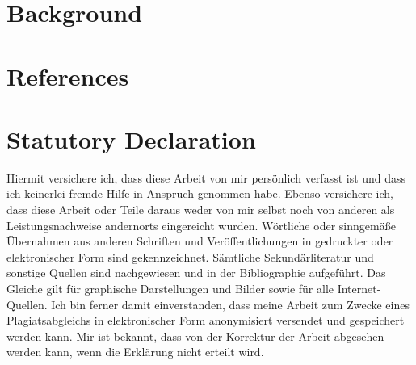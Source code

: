 \documentclass[12pt,english,a4paper,oneside]{article}
\newlength{\cslhangindent}
\newlength{\cslentryspacingunit} %
\newenvironment{CSLReferences}[2] %
 {%
  \setlength{\parindent}{0pt}
  \ifodd #1
  \let\oldpar\par
  \def\par{\hangindent=\cslhangindent\oldpar}
  \fi
  \setlength{\parskip}{#2\cslentryspacingunit}
 }%
 {}
\begin{document}
\newpage







{
\setcounter{tocdepth}{2}
\newpage
{}
\tableofcontents
}

\newpage
{}
\pagestyle{plain}
\hypertarget{background}{%
\section{Background}\label{background}}

\newpage

\hypertarget{references}{%
\section*{References}\label{references}}

\singlespacing

\hypertarget{refs}{}
\begin{CSLReferences}{0}{0}
\end{CSLReferences}

\clearpage

\hypertarget{statutory-declaration}{%
\section*{Statutory Declaration}\label{statutory-declaration}}

Hiermit versichere ich, dass diese Arbeit von mir persönlich verfasst ist und dass ich keinerlei fremde Hilfe in Anspruch genommen habe.
Ebenso versichere ich, dass diese Arbeit oder Teile daraus weder von mir selbst noch von anderen als Leistungsnachweise andernorts eingereicht wurden.
Wörtliche oder sinngemäße Übernahmen aus anderen Schriften und Veröffentlichungen in gedruckter oder elektronischer Form sind gekennzeichnet.
Sämtliche Sekundärliteratur und sonstige Quellen sind nachgewiesen und in der Bibliographie aufgeführt.
Das Gleiche gilt für graphische Darstellungen und Bilder sowie für alle Internet-Quellen.
Ich bin ferner damit einverstanden, dass meine Arbeit zum Zwecke eines Plagiatsabgleichs in elektronischer Form anonymisiert versendet und gespeichert werden kann.
Mir ist bekannt, dass von der Korrektur der Arbeit abgesehen werden kann, wenn die Erklärung nicht erteilt wird.
\end{document}
